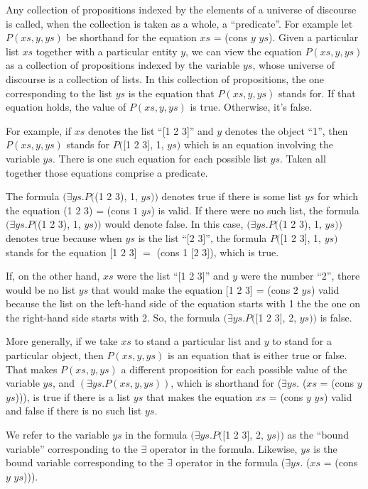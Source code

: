 Any collection of propositions
indexed by the elements of a universe of discourse is called,
when the collection is taken as a whole, a ``predicate''.
For example
let $P(xs, y, ys)$ be shorthand for the equation $xs$ = (cons $y$ $ys$).
Given a particular list $xs$ together with a particular entity $y$,
we can view the equation $P(xs, y, ys)$ as a collection of propositions
indexed by the variable $ys$, whose universe of discourse is a collection of lists.
In this collection of propositions, the one corresponding to
the list $ys$ is the equation that $P(xs, y, ys)$ stands for.
If that equation holds, the value of $P(xs, y, ys)$ is true.
Otherwise, it's false.

For example, if $xs$ denotes the list ``[1 2 3]''
and $y$ denotes the object ``1'',
then $P(xs, y, ys)$ stands for $P($[1 2 3], 1, $ys)$
which is an equation involving the variable $ys$.
There is one such equation for each possible list $ys$.
Taken all together those equations comprise a predicate.

The formula
$(\exists ys.P($(1 2 3), 1, $ys))$ denotes true
if there is some list $ys$
for which the equation (1 2 3) = (cons $1$ $ys$) is valid.
If there were no such list, the formula $(\exists ys.P($(1 2 3), 1, $ys))$
would denote false.
In this case, $(\exists ys.P($(1 2 3), 1, $ys))$ denotes true
because when $ys$ is the list ``[2 3]'', the
formula $P($[1 2 3], 1, $ys)$ stands for the equation
[1 2 3] $=$ (cons 1 [2 3]), which is true.

If, on the other hand, $xs$ were the list ``[1 2 3]''
and $y$ were the number ``2'', there would be no list
$ys$ that would make the equation [1 2 3] = (cons $2$ $ys$) valid
because the list on the left-hand side of the equation
starts with 1 the the one on the right-hand side starts with 2.
So, the formula $(\exists ys.P($[1 2 3], 2, $ys))$
is false.

More generally, if we take $xs$ to stand a particular list
and $y$ to stand for a particular object, then
$P(xs, y, ys)$ is an equation that is either true or false.
That makes $P(xs, y, ys)$ a different proposition
for each possible value of the variable $ys$,
and $(\exists ys.P(xs, y, ys))$, which is
shorthand for
($\exists ys.$ ($xs$ = (cons $y$ $ys$))),
is true if there is a list $ys$ that makes the
equation $xs$ = (cons $y$ $ys$) valid and false if there is no such list $ys$.

We refer to the variable $ys$ in the formula $(\exists ys.P($[1 2 3], 2, $ys))$
as the ``bound variable'' corresponding to the $\exists$ operator in the formula.
Likewise, $ys$ is the bound variable corresponding
to the $\exists$ operator in the formula
($\exists ys.$ ($xs$ = (cons $y$ $ys$))).

